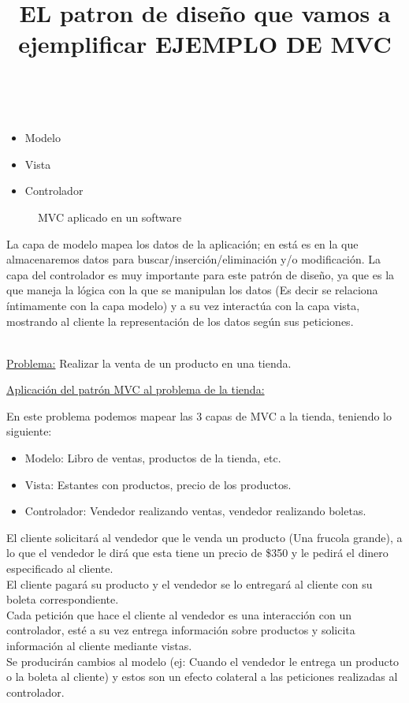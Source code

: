 \documentclass[a4paper,11pt]{report}
\begin{document}
\title{\textbf{EL patron de diseño que vamos a ejemplificar}}\\






\begin{itemize}
    \item{Modelo}
    \item{Vista}
    \item{Controlador}
\end{itemize}

\begin{figure}[!ht]
\begin{center}

\caption{MVC aplicado en un software}
\end{center}
\end{figure}


 \newpage
La capa de modelo mapea los datos de la aplicación; en está es en la que almacenaremos datos para buscar/inserción/eliminación y/o modificación.
La capa del controlador es muy importante para este patrón de diseño, ya que es la
que maneja la lógica con la que se manipulan los datos (Es decir se relaciona íntimamente con
la capa modelo) y a su vez interactúa con la capa vista, mostrando al cliente la representación de los datos según sus peticiones.\\

\title {\textbf{ EJEMPLO DE MVC}}\\

\underline{Problema:} Realizar la venta de un producto en una tienda.

\underline{Aplicación del patrón MVC al problema de la tienda:}

En este problema podemos mapear las 3 capas de MVC a la tienda, teniendo lo siguiente:

\begin{itemize}
    \item{Modelo:} Libro de ventas, productos de la tienda, etc. 
    \item{Vista:} Estantes con productos, precio de los productos.
    \item{Controlador:} Vendedor realizando ventas, vendedor realizando boletas.
\end{itemize}

El cliente solicitará al vendedor que le venda un producto (Una frucola grande),
a lo que el vendedor le dirá que esta tiene un precio de \$350 y le pedirá el dinero especificado al cliente.\\
El cliente pagará su producto y el vendedor se lo entregará al cliente con su boleta correspondiente.\\
Cada petición que hace el cliente al vendedor es una interacción con
un controlador, esté a su vez entrega información sobre productos y solicita información al cliente mediante vistas.\\
Se producirán cambios al modelo (ej: Cuando el vendedor le entrega
un producto o la boleta al cliente) y estos son un efecto colateral a las peticiones realizadas al controlador.
\end{document}
